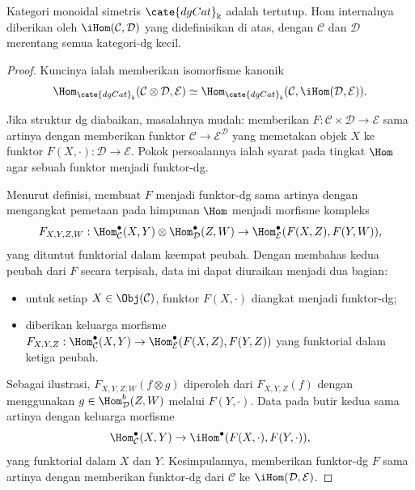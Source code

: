 \begin{proposition}\label{prop:dgCat-closed}
	Kategori monoidal simetris $\cate{dgCat}_{\Bbbk}$ adalah tertutup. Hom
	internalnya diberikan oleh $\iHom(\mathcal{C},\mathcal{D})$ yang
	didefinisikan di atas, dengan $\mathcal{C}$ dan $\mathcal{D}$ merentang
	semua kategori-dg kecil.
\end{proposition}
\begin{proof}
	Kuncinya ialah memberikan isomorfisme kanonik
	\[ \Hom_{\cate{dgCat}_{\Bbbk}}(\mathcal{C} \otimes \mathcal{D}, \mathcal{E}) \simeq \Hom_{\cate{dgCat}_{\Bbbk}}(\mathcal{C}, \iHom(\mathcal{D}, \mathcal{E}) ). \]

	Jika struktur dg diabaikan, masalahnya mudah: memberikan
	$F:\mathcal{C}\times\mathcal{D}\to\mathcal{E}$ sama artinya dengan
	memberikan funktor $\mathcal{C}\to\mathcal{E}^{\mathcal{D}}$ yang
	memetakan objek $X$ ke funktor
	$F(X,\mathord\cdot):\mathcal{D}\to\mathcal{E}$. Pokok persoalannya ialah
	syarat pada tingkat $\Hom$ agar sebuah funktor menjadi funktor-dg.

	Menurut definisi, membuat $F$ menjadi funktor-dg sama artinya dengan
	mengangkat pemetaan pada himpunan $\Hom$ menjadi morfisme kompleks
	\[ F_{X, Y, Z, W}: \Hom^\bullet_{\mathcal{C}}(X, Y) \otimes \Hom^\bullet_{\mathcal{D}}(Z, W) \to \Hom^\bullet_{\mathcal{E}}(F(X, Z), F(Y, W)), \]
	yang dituntut funktorial dalam keempat peubah. Dengan membahas kedua peubah
	dari $F$ secara terpisah, data ini dapat diuraikan menjadi dua bagian:
	\begin{itemize}
		\item untuk setiap $X\in\Obj(\mathcal{C})$, funktor
		$F(X,\mathord\cdot)$ diangkat menjadi funktor-dg;
		\item diberikan keluarga morfisme
		$F_{X,Y,Z}:\Hom^\bullet_{\mathcal{C}}(X,Y)\to
		\Hom^\bullet_{\mathcal{E}}(F(X,Z),F(Y,Z))$ yang funktorial dalam ketiga
		peubah.
	\end{itemize}
	Sebagai ilustrasi, $F_{X,Y,Z,W}(f\otimes g)$ diperoleh dari
	$F_{X,Y,Z}(f)$ dengan menggunakan
	$g\in\Hom^b_{\mathcal{D}}(Z,W)$ melalui $F(Y,\mathord\cdot)$. Data pada butir
	kedua sama artinya dengan keluarga morfisme
	\[ \Hom^\bullet_{\mathcal{C}}(X, Y) \to \iHom^\bullet(F(X, \cdot), F(Y, \cdot)), \]
	yang funktorial dalam $X$ dan $Y$. Kesimpulannya, memberikan funktor-dg
$F$ sama artinya dengan memberikan funktor-dg dari $\mathcal{C}$ ke
$\iHom(\mathcal{D},\mathcal{E})$.
\end{proof}

